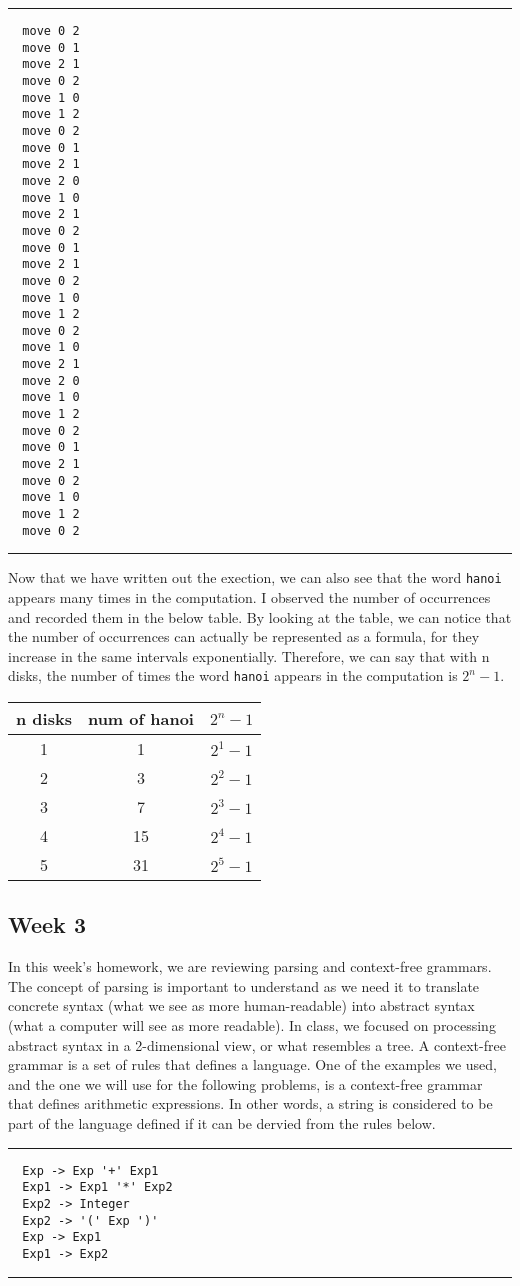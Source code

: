 \documentclass{article}
\theoremstyle{theorem}
\theoremstyle{definition}
\theoremstyle{remark}
\begin{document}
\noindent
  {\color{gray} \rule{\linewidth}{0.05mm}}
\begin{verbatim}
  move 0 2
  move 0 1
  move 2 1
  move 0 2
  move 1 0
  move 1 2
  move 0 2
  move 0 1 
  move 2 1
  move 2 0
  move 1 0
  move 2 1
  move 0 2
  move 0 1
  move 2 1
  move 0 2
  move 1 0
  move 1 2
  move 0 2
  move 1 0
  move 2 1
  move 2 0
  move 1 0
  move 1 2
  move 0 2
  move 0 1
  move 2 1
  move 0 2
  move 1 0
  move 1 2
  move 0 2
\end{verbatim}
\noindent
  {\color{gray} \rule{\linewidth}{0.05mm}}

Now that we have written out the exection, we can also see that the word \texttt{hanoi} appears many times in the computation. I observed the number of occurrences and recorded them in the below table. By looking at the table, we can notice that the
number of occurrences can actually be represented as a formula, for they increase in the same intervals exponentially. Therefore, we can say that with n disks, the number of times the word \texttt{hanoi} appears in the computation is \(2^n - 1\). 
\begin{center}
  \begin{tabular}{|c c c|}
    \hline
    n disks & num of hanoi  & \(2^n - 1\)\\
    \hline 
    1 & 1 & \(2^1 - 1\)\\
    \hline 
    2 & 3 & \(2^2 - 1\)\\
    \hline 
    3 & 7 & \(2^3 - 1\)\\
    \hline 
    4 & 15 & \(2^4 - 1\)\\
    \hline 
    5 & 31 & \(2^5 - 1\)\\
    \hline
  \end{tabular}
\end{center}


\subsection{Week 3}
In this week's homework, we are reviewing parsing and context-free grammars. The concept of parsing is important to understand as we need it to translate concrete syntax (what we see as more human-readable) into abstract syntax (what a computer will see as more readable). 
In class, we focused on processing abstract syntax in a 2-dimensional view, or what resembles a tree. A context-free grammar is a set of rules that defines a language. One of the examples we used, and the one we will use for the following problems, is a context-free grammar that 
defines arithmetic expressions. In other words, a string is considered to be part of the language defined if it can be dervied from the rules below. \\
\noindent
  {\color{gray} \rule{\linewidth}{0.05mm}}
\begin{verbatim}
  Exp -> Exp '+' Exp1
  Exp1 -> Exp1 '*' Exp2
  Exp2 -> Integer 
  Exp2 -> '(' Exp ')'
  Exp -> Exp1
  Exp1 -> Exp2
\end{verbatim}
\noindent
  {\color{gray} \rule{\linewidth}{0.05mm}}
\end{document}

